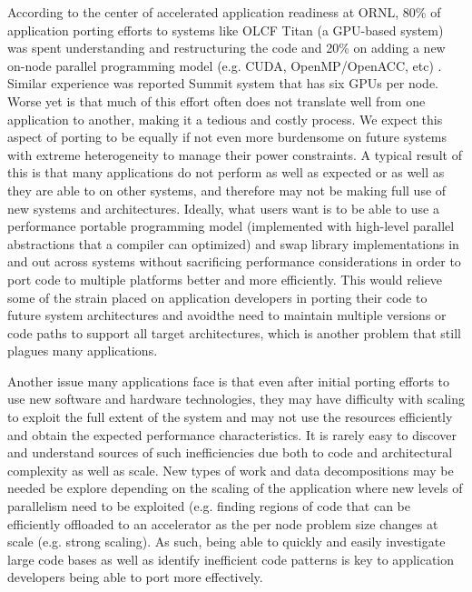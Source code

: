 According to the center of accelerated application readiness at \acs{ORNL}, 80\% of application porting efforts 
to systems like OLCF Titan (a \acs{GPU}-based system) was spent understanding and restructuring the code and 20\% on 
adding a new on-node parallel programming model (e.g. CUDA, OpenMP/OpenACC, etc) \cite{titan}. Similar experience was reported Summit system that has six GPUs per node.  
Worse yet is that much of this effort often does not translate well from one application to another, making it a 
tedious and costly process.
We expect this aspect of porting to be equally if not even more burdensome on future systems with extreme heterogeneity to manage their power constraints.  A typical result of this is that many applications do not perform as well as expected or as well as they are able 
to on other systems, and therefore may not be making full use of new systems and architectures.
Ideally, what users want is to be able to use a performance portable programming model (implemented with high-level parallel abstractions that a compiler can optimized) and swap library implementations in and out across systems without 
sacrificing performance considerations in order to port code to multiple platforms better and more efficiently.
This would relieve some of the strain placed on application developers in porting their code to 
future system architectures and avoidthe need to maintain multiple versions or code paths to support all target architectures, 
which is another problem that still plagues many applications.

Another issue many applications face is that even after initial porting efforts to use new software and hardware 
technologies, they may have difficulty with scaling to exploit the full extent of the system and may not use the 
resources efficiently and obtain the expected performance characteristics.
It is rarely easy to discover and understand sources of such inefficiencies due both to code and architectural 
complexity as well as scale. New types of work and data decompositions may be needed be explore depending on the scaling of the application where new levels of parallelism need to be exploited (e.g. finding regions of code that can be efficiently offloaded to an accelerator as the per node problem size changes at scale (e.g. strong scaling). As such, being able to quickly and easily investigate large code bases as well as identify inefficient code 
patterns is key to application developers being able to port more effectively.

